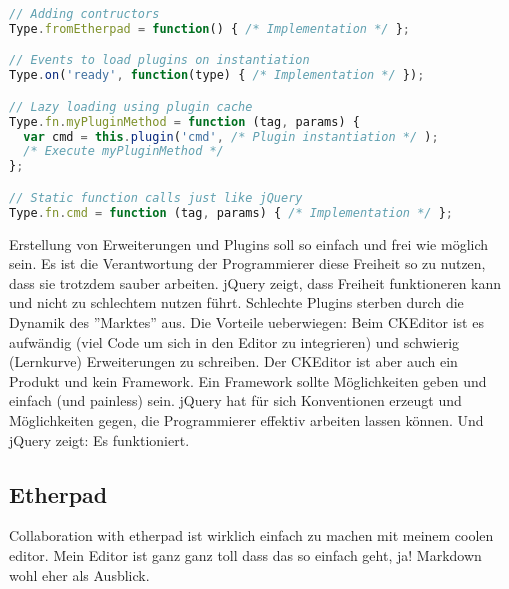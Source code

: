\begin{lstlisting}[language=JavaScript, caption=Example calls to format text, label=lst:format-examples]
// Adding contructors
Type.fromEtherpad = function() { /* Implementation */ };

// Events to load plugins on instantiation
Type.on('ready', function(type) { /* Implementation */ });

// Lazy loading using plugin cache
Type.fn.myPluginMethod = function (tag, params) {
  var cmd = this.plugin('cmd', /* Plugin instantiation */ );
  /* Execute myPluginMethod */
};

// Static function calls just like jQuery
Type.fn.cmd = function (tag, params) { /* Implementation */ };
\end{lstlisting}

Erstellung von Erweiterungen und Plugins soll so einfach und frei wie möglich sein. Es ist die Verantwortung der Programmierer diese Freiheit so zu nutzen, dass sie trotzdem sauber arbeiten. jQuery zeigt, dass Freiheit funktioneren kann und nicht zu schlechtem nutzen führt. Schlechte Plugins sterben durch die Dynamik des ''Marktes'' aus. Die Vorteile ueberwiegen: Beim CKEditor ist es aufwändig (viel Code um sich in den Editor zu integrieren) und schwierig (Lernkurve) Erweiterungen zu schreiben. Der CKEditor ist aber auch ein Produkt und kein Framework. Ein Framework sollte Möglichkeiten geben und einfach (und painless) sein. jQuery hat für sich Konventionen erzeugt und Möglichkeiten gegen, die Programmierer effektiv arbeiten lassen können. Und jQuery zeigt: Es funktioniert.

\subsection{Etherpad} Collaboration with etherpad ist wirklich einfach zu machen mit meinem coolen editor. Mein Editor ist ganz ganz toll dass das so einfach geht, ja!
Markdown wohl eher als Ausblick.
